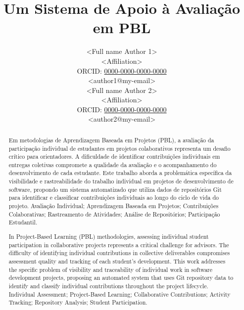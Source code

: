 \documentclass[english, spanish, brazilian]{RBIEarticle} %
\title{Um Sistema de Apoio à Avaliação em PBL}
\author{%
	\parbox{8cm}{%
		<Full name Author 1>\\
		<Affiliation>\\
		ORCID: \href{https://orcid.org/0000-0000-0000-0000}{0000-0000-0000-0000}\\
		<author1@my-email>
	}
	\parbox{8cm}{%
		<Full name Author 2>\\
		<Affiliation>\\
		ORCID: \href{https://orcid.org/0000-0000-0000-0000}{0000-0000-0000-0000}\\
		<author2@my-email>
	}
}
\begin{document}
\addto\captionsbrazilian{%
  \renewcommand{\abstractname}{Resumo}%
}
\addto\captionsspanish{%
  \renewcommand{\abstractname}{Resumen}%
}

\maketitle

\begin{otherlanguage}{brazilian}
\begin{abstract}
Em metodologias de Aprendizagem Baseada em Projetos (PBL), a avaliação da participação individual de estudantes em projetos colaborativos representa um desafio crítico para orientadores. A dificuldade de identificar contribuições individuais em entregas coletivas compromete a qualidade da avaliação e o acompanhamento do desenvolvimento de cada estudante. Este trabalho aborda a problemática específica da visibilidade e rastreabilidade do trabalho individual em projetos de desenvolvimento de software, propondo um sistema automatizado que utiliza dados de repositórios Git para identificar e classificar contribuições individuais ao longo do ciclo de vida do projeto.
\keywords Avaliação Individual; Aprendizagem Baseada em Projetos; Contribuições Colaborativas; Rastreamento de Atividades; Análise de Repositórios; Participação Estudantil.
\end{abstract}
\end{otherlanguage}

\begin{otherlanguage}{english}
\begin{abstract}
In Project-Based Learning (PBL) methodologies, assessing individual student participation in collaborative projects represents a critical challenge for advisors. The difficulty of identifying individual contributions in collective deliverables compromises assessment quality and tracking of each student's development. This work addresses the specific problem of visibility and traceability of individual work in software development projects, proposing an automated system that uses Git repository data to identify and classify individual contributions throughout the project lifecycle.
\keywords Individual Assessment; Project-Based Learning; Collaborative Contributions; Activity Tracking; Repository Analysis; Student Participation.
\end{abstract}
\end{otherlanguage}
\end{document}
